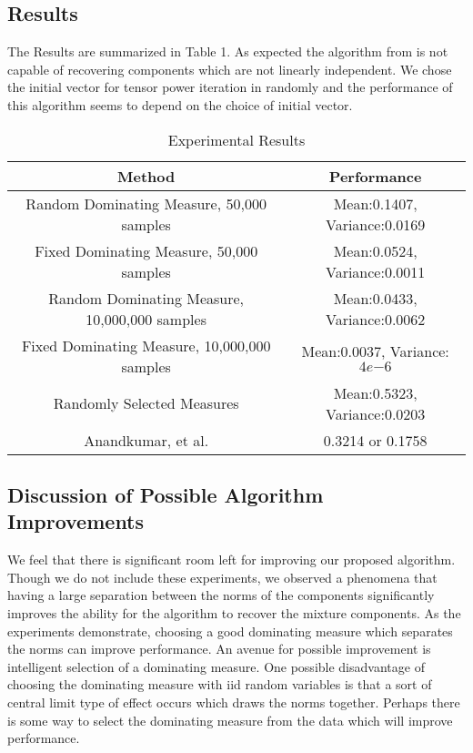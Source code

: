 \documentclass[aos,preprint]{imsart}
\theoremstyle{plain}
\theoremstyle{defintion}
\begin{document}
	\subsection{Results}
        The Results are summarized in Table 1. As expected the algorithm from \cite{anandkumar14} is not capable of recovering components which are not linearly independent. We chose the initial vector for tensor power iteration in \cite{anandkumar14} randomly and the performance of this algorithm seems to depend on the choice of initial vector.
	\begin{table*}[!tb]
		\caption{Experimental Results}
		\hfill{}
		\begin{center}
			\begin{tabular}{| *{2}{c|}}
				\hline
				Method &Performance\\
				\hline
				Random Dominating Measure, 50,000 samples& Mean:0.1407, Variance:0.0169\\
				\hline
				Fixed Dominating Measure, 50,000 samples & Mean:0.0524, Variance:0.0011\\
				\hline
				Random Dominating Measure, 10,000,000 samples & Mean:0.0433, Variance:0.0062\\
				\hline
                                Fixed Dominating Measure, 10,000,000 samples & Mean:0.0037, Variance: $4e{-6}$\\
				\hline
				Randomly Selected Measures& Mean:0.5323, Variance:0.0203\\
				\hline
				Anandkumar, et al. \cite{anandkumar14}& 0.3214 or 0.1758\\
				\hline
			\end{tabular}
		\end{center}
		\hfill{}
	\end{table*}

	\subsection{Discussion of Possible Algorithm Improvements}
	We feel that there is significant room left for improving our proposed algorithm. Though we do not include these experiments, we observed a phenomena that having a large separation between the norms of the components significantly improves the ability for the algorithm to recover the mixture components. As the experiments demonstrate, choosing a good dominating measure which separates the norms can improve performance. An avenue for possible improvement is intelligent selection of a dominating measure. One possible disadvantage of choosing the dominating measure with iid random variables is that a sort of central limit type of effect occurs which draws the norms together. Perhaps there is some way to select the dominating measure from the data which will improve performance.
\end{document}
